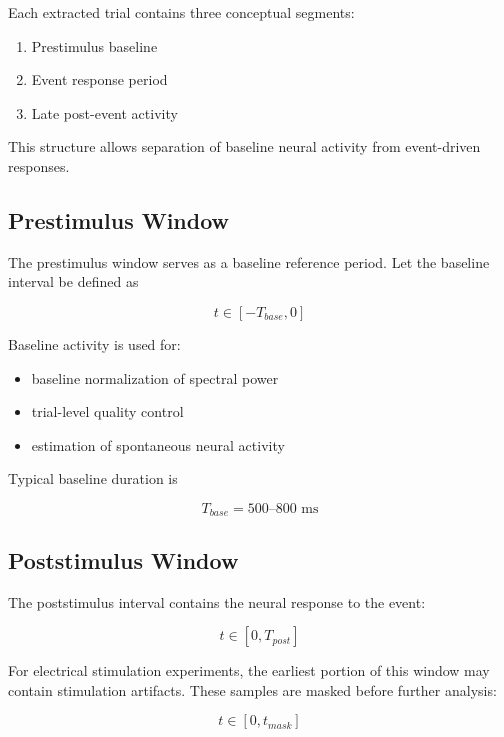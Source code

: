 \documentclass[11pt]{report}
\begin{document}
Each extracted trial contains three conceptual segments:

\begin{enumerate}
\item Prestimulus baseline
\item Event response period
\item Late post-event activity
\end{enumerate}

This structure allows separation of baseline neural activity from
event-driven responses.

\subsection{Prestimulus Window}

The prestimulus window serves as a baseline reference period.
Let the baseline interval be defined as

\begin{equation}
t \in [-T_{base}, 0]
\end{equation}

Baseline activity is used for:

\begin{itemize}
\item baseline normalization of spectral power
\item trial-level quality control
\item estimation of spontaneous neural activity
\end{itemize}

Typical baseline duration is

\begin{equation}
T_{base} = 500\text{--}800 \text{ ms}
\end{equation}

\subsection{Poststimulus Window}

The poststimulus interval contains the neural response to the event:

\begin{equation}
t \in [0, T_{post}]
\end{equation}

For electrical stimulation experiments, the earliest portion of this
window may contain stimulation artifacts. These samples are masked
before further analysis:

\begin{equation}
t \in [0, t_{mask}]
\end{equation}
\end{document}
